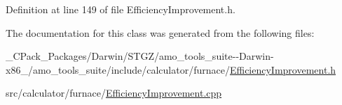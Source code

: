 Definition at line 149 of file Efficiency\+Improvement.\+h.



The documentation for this class was generated from the following files\+:\begin{DoxyCompactItemize}
\item 
\+\_\+\+C\+Pack\+\_\+\+Packages/\+Darwin/\+S\+T\+G\+Z/amo\+\_\+tools\+\_\+suite-\/-\/\+Darwin-\/x86\+\_/amo\+\_\+tools\+\_\+suite/include/calculator/furnace/\hyperlink{___c_pack___packages_2_darwin_2_s_t_g_z_2amo__tools__suite--_darwin-x86__64_2amo__tools__suite_26e7520aa6e88764b15ca5320d25b7632}{Efficiency\+Improvement.\+h}\item 
src/calculator/furnace/\hyperlink{_efficiency_improvement_8cpp}{Efficiency\+Improvement.\+cpp}\end{DoxyCompactItemize}
